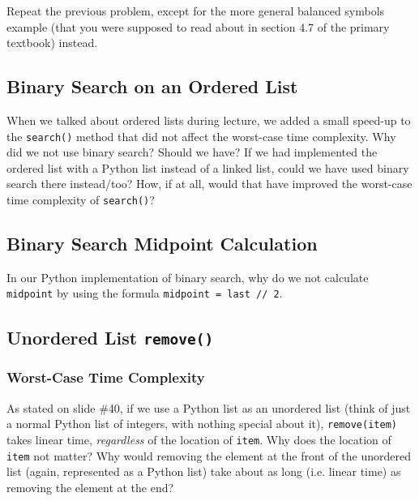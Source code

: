 \documentclass{article}
\begin{document}
Repeat the previous problem, except for the more general balanced symbols example (that you were supposed to read about in section 4.7 of the primary textbook) instead.

\begin{mdframed}
\vspace{3em}
\end{mdframed}

\subsection{Binary Search on an Ordered List}

When we talked about ordered lists during lecture, we added a small speed-up to the \lstinline{search()} method that did not affect the worst-case time complexity. Why did we not use binary search? Should we have? If we had implemented the ordered list with a Python list instead of a linked list, could we have used binary search there instead/too? How, if at all, would that have improved the worst-case time complexity of \lstinline{search()}?

\begin{mdframed}
\vspace{3em}
\end{mdframed}

\subsection{Binary Search Midpoint Calculation}

In our Python implementation of binary search, why do we not calculate \lstinline{midpoint} by using the formula \lstinline{midpoint = last // 2}.

\begin{mdframed}
\vspace{3em}
\end{mdframed}

\subsection{Unordered List \lstinline{remove()}}

\subsubsection{Worst-Case Time Complexity}

As stated on slide \#40, if we use a Python list as an unordered list (think of just a normal Python list of integers, with nothing special about it), \lstinline{remove(item)} takes linear time, \textit{regardless} of the location of \lstinline{item}. Why does the location of \lstinline{item} not matter? Why would removing the element at the front of the unordered list (again, represented as a Python list) take about as long (i.e. linear time) as removing the element at the end?
\end{document}
